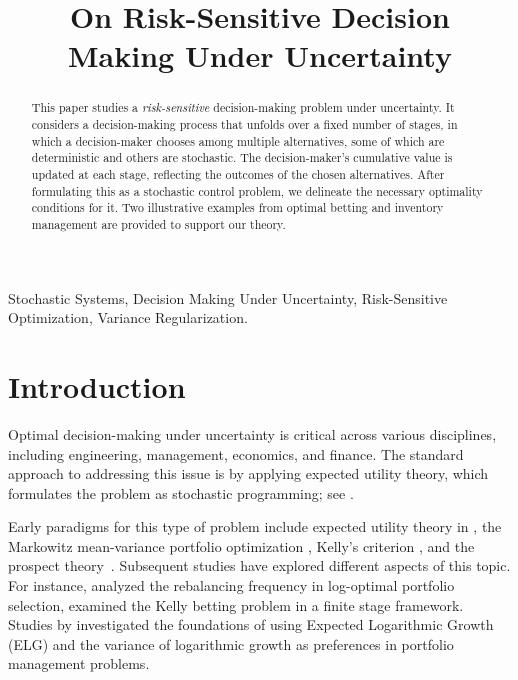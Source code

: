 
\title{On Risk-Sensitive
Decision  \\ Making Under Uncertainty}
\maketitle
	\thispagestyle{empty}
	\pagestyle{empty}
	
	
\begin{abstract} 
    This paper studies a {\em risk-sensitive} decision-making problem under uncertainty. It considers a decision-making process that unfolds over a fixed number of stages, in which a decision-maker chooses among multiple alternatives, some of which are deterministic and others are stochastic. The decision-maker's cumulative value is updated at each stage, reflecting the outcomes of the chosen alternatives. After formulating this as a stochastic control problem, we delineate the necessary optimality conditions for it. Two illustrative examples from optimal betting and inventory management are provided to support our theory.
\end{abstract}
	
\vspace{3mm}
\begin{IEEEkeywords}
Stochastic Systems, Decision Making Under Uncertainty, Risk-Sensitive Optimization, Variance Regularization. 
\end{IEEEkeywords}
	
	
\section{Introduction}\label{section: introduction}
Optimal decision-making under uncertainty is critical across various disciplines, including engineering, management, economics, and finance. The standard approach to addressing this issue is by applying expected utility theory, which formulates the problem as stochastic programming; see \cite{shapiro2021lectures, bertsekas2012dynamic}.


Early paradigms for this type of problem include expected utility theory in \cite{von2007theory}, the Markowitz mean-variance portfolio optimization \cite{Markowitz_1952},  Kelly's criterion \cite{Kelly_1956, thorp2006kelly}, and the prospect theory~\cite{kahneman1979prospect}. Subsequent studies have explored different aspects of this topic. For instance, \cite{kuhn2010analysis} analyzed the rebalancing frequency in log-optimal portfolio selection, \cite{wu2020analysis} examined the Kelly betting problem in a finite stage framework. Studies by \cite{luenberger1993preference, luenberger2013investment} investigated the foundations of using Expected Logarithmic Growth (ELG) and the variance of logarithmic growth as preferences in portfolio management problems. 


